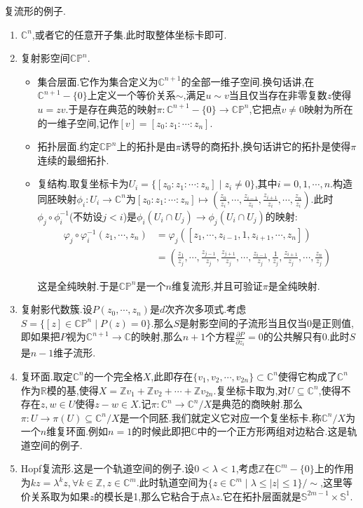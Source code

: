 复流形的例子.
\begin{enumerate}
	\item $\mathbb{C}^n$,或者它的任意开子集.此时取整体坐标卡即可.
	\item 复射影空间$\mathbb{CP}^n$.
	\begin{itemize}
		\item 集合层面.它作为集合定义为$\mathbb{C}^{n+1}$的全部一维子空间.换句话讲,在$\mathbb{C}^{n+1}-\{0\}$上定义一个等价关系$\sim$,满足$u\sim v$当且仅当存在非零复数$z$使得$u=zv$.于是存在典范的映射$\pi:\mathbb{C}^{n+1}-\{0\}\to\mathbb{CP}^n$,它把点$v\not=0$映射为所在的一维子空间,记作$[v]=[z_0:z_1:\cdots:z_n]$.
		\item 拓扑层面.约定$\mathbb{CP}^n$上的拓扑是由$\pi$诱导的商拓扑,换句话讲它的拓扑是使得$\pi$连续的最细拓扑.
		\item 复结构.取复坐标卡为$U_i=\{[z_0:z_1:\cdots:z_n]\mid z_i\not=0\}$,其中$i=0,1,\cdots,n$.构造同胚映射$\phi_i:U_i\to\mathbb{C}^n$为$[z_0:z_1:\cdots:z_n]\mapsto\left(\frac{z_0}{z_i},\cdots,\frac{z_{i-1}}{z_i},\frac{z_{i+1}}{z_i},\cdots,\frac{z_n}{z_i}\right)$.此时$\phi_j\circ\phi_i^{-1}$(不妨设$j<i$)是$\phi_i(U_i\cap U_j)\to\phi_j(U_i\cap U_j)$的映射:
		\begin{align*}
			\varphi_j\circ\varphi_i^{-1}(z_1,\cdots,z_n)&=\varphi_j([z_1,\cdots,z_{i-1},1,z_{i+1},\cdots,z_n])\\&=\left(\frac{z_1}{z_j},\cdots,\frac{z_{j-1}}{z_j},\frac{z_{j+1}}{z_j},\cdots,\frac{z_{i-1}}{z_j},\frac{1}{z_j},\frac{z_{i+1}}{z_j},\cdots,\frac{z_n}{z_j}\right)
		\end{align*}
		
		这是全纯映射.于是$\mathbb{CP}^n$是一个$n$维复流形,并且可验证$\pi$是全纯映射.
	\end{itemize}
    \item 复射影代数簇.设$P(z_0,\cdots,z_n)$是$d$次齐次多项式.考虑$S=\{[z]\in\mathbb{CP}^n\mid P(z)=0\}$.那么$S$是射影空间的子流形当且仅当0是正则值,即如果把$P$视为$\mathbb{C}^{n+1}\to\mathbb{C}$的映射,那么$n+1$个方程$\frac{\partial P}{\partial z_i}=0$的公共解只有0.此时$S$是$n-1$维子流形.
    \item 复环面.取定$\mathbb{C}^n$的一个完全格$X$,此即存在$\{v_1,v_2,\cdots,v_{2n}\}\subset\mathbb{C}^n$使得它构成了$\mathbb{C}^n$作为$\mathbb{R}$模的基,使得$X=\mathbb{Z}v_1+\mathbb{Z}v_2+\cdots+\mathbb{Z}v_{2n}$.复坐标卡取为,对$U\subseteq\mathbb{C}^n$,使得不存在$z,w\in U$使得$z-w\in X$.记$\pi:\mathbb{C}^n\to\mathbb{C}^n/X$是典范的商映射.那么$\pi:U\to\pi(U)\subseteq\mathbb{C}^n/X$是一个同胚.我们就定义它对应一个复坐标卡.称$\mathbb{C}^n/X$为一个$n$维复环面.例如$n=1$的时候此即把$\mathbb{C}$中的一个正方形两组对边粘合.这是轨道空间的例子.
    \item Hopf复流形.这是一个轨道空间的例子.设$0<\lambda<1$,考虑$\mathbb{Z}$在$\mathbb{C}^m-\{0\}$上的作用为$kz=\lambda^kz,\forall k\in\mathbb{Z},z\in\mathbb{C}^m$.此时轨道空间为$\{z\in\mathbb{C}^m\mid\lambda\le|z|\le1\}/\sim$,这里等价关系取为如果$z$的模长是1,那么它粘合于点$\lambda z$.它在拓扑层面就是$\mathbb{S}^{2m-1}\times\mathbb{S}^1$.
\end{enumerate}

